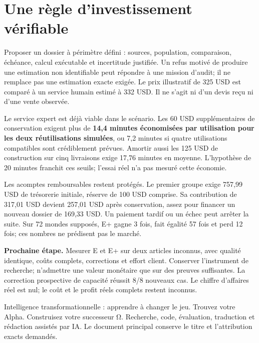 \documentclass[10pt]{article}
\begin{document}
\section*{Une règle d'investissement vérifiable}

Proposer un dossier à périmètre défini : sources, population, comparaison, échéance, calcul exécutable et incertitude justifiée. Un refus motivé de produire une estimation non identifiable peut répondre à une mission d'audit; il ne remplace pas une estimation exacte exigée. Le prix illustratif de 325 USD est comparé à un service humain estimé à 332 USD. Il ne s'agit ni d'un devis reçu ni d'une vente observée.

Le service expert est déjà viable dans le scénario. Les 60 USD supplémentaires de conservation exigent plus de \textbf{14,4 minutes économisées par utilisation pour les deux réutilisations simulées}, ou 7,2 minutes si quatre utilisations compatibles sont crédiblement prévues. Amortir aussi les 125 USD de construction sur cinq livraisons exige 17,76 minutes en moyenne. L'hypothèse de 20 minutes franchit ces seuils; l'essai réel n'a pas mesuré cette économie.

Les acomptes remboursables restent protégés. Le premier groupe exige 757,99 USD de trésorerie initiale, réserve de 100 USD comprise. Sa contribution de 317,01 USD devient 257,01 USD après conservation, assez pour financer un nouveau dossier de 169,33 USD. Un paiement tardif ou un échec peut arrêter la suite. Sur 72 mondes supposés, E+ gagne 3 fois, fait égalité 57 fois et perd 12 fois; ces nombres ne prédisent pas le marché.

\textbf{Prochaine étape.} Mesurer E et E+ sur deux articles inconnus, avec qualité identique, coûts complets, corrections et effort client. Conserver l'instrument de recherche; n'admettre une valeur monétaire que sur des preuves suffisantes. La correction prospective de capacité réussit 8/8 nouveaux cas. Le chiffre d'affaires réel est nul; le coût et le profit réels complets restent inconnus.

{\footnotesize Intelligence transformationnelle : apprendre à changer le jeu. Trouvez votre Alpha. Construisez votre successeur Ω. Recherche, code, évaluation, traduction et rédaction assistés par IA. Le document principal conserve le titre et l'attribution exacts demandés.}
\end{document}
